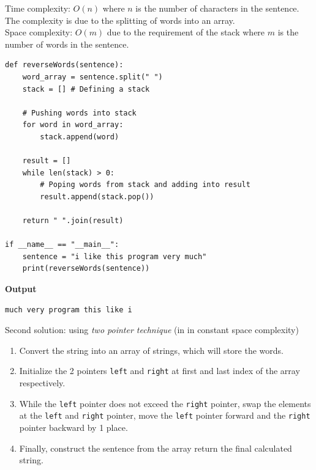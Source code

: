 \documentclass[a4paper,11pt]{book}
\begin{document}
\noindent Time complexity: $O(n)$ where $n$ is the number of characters in the sentence. The complexity is due to the splitting of words into an array.\\
\noindent Space complexity: $O(m)$ due to the requirement of the stack where $m$ is the number of words in the sentence.
\begin{lstlisting}
def reverseWords(sentence):
    word_array = sentence.split(" ")
    stack = [] # Defining a stack

    # Pushing words into stack
    for word in word_array:
        stack.append(word)

    result = []
    while len(stack) > 0:
        # Poping words from stack and adding into result
        result.append(stack.pop())
  
    return " ".join(result)

if __name__ == "__main__":
    sentence = "i like this program very much"
    print(reverseWords(sentence))
\end{lstlisting}
\textbf{Output}
\begin{lstlisting}
much very program this like i
\end{lstlisting}

\noindent Second solution: using \textit{two pointer technique} (in in constant space complexity)
\begin{enumerate}
    \item Convert the string into an array of strings, which will store the words.
    \item Initialize the 2 pointers \lstinline{left} and \lstinline{right} at first and last index of the array respectively.
    \item While the \lstinline{left} pointer does not exceed the \lstinline{right} pointer, swap the elements at the \lstinline{left} and \lstinline{right} pointer, move the \lstinline{left} pointer forward and the \lstinline{right} pointer backward by 1 place.
    \item Finally, construct the sentence from the array return the final calculated string.
\end{enumerate}

\vspace{5mm}
\end{document}
